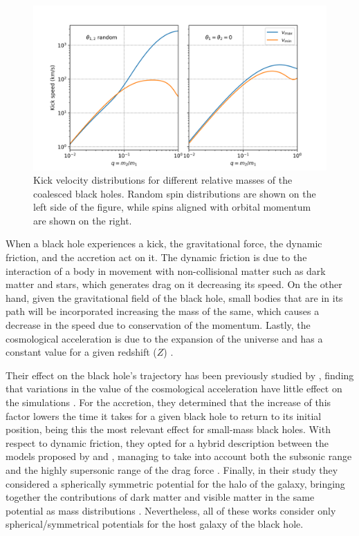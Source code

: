 	\begin{figure}[h]
		\centering
		\includegraphics[width=0.9\linewidth]{"../Files/Week 10/Tanaka"}
		\caption{Kick velocity distributions for different relative masses of the coalesced black holes. Random spin distributions are shown on the left side of the figure, while spins aligned with orbital momentum are shown on the right.}
		\label{fig: tanakaSpeeds}
	\end{figure}
	
	When a black hole experiences a kick, the gravitational force, the dynamic friction, and the accretion act on it. The dynamic friction is due to the interaction of a body in movement with non-collisional matter such as dark matter and stars, which generates drag on it decreasing its speed. On the other hand, given the gravitational field of the black hole, small bodies that are in its path will be incorporated increasing the mass of the same, which causes a decrease in the speed due to conservation of the momentum. Lastly, the cosmological acceleration is due to the expansion of the universe and has a constant value for a given redshift ($Z$) \cite{choksi2017recoiling}.
	
	Their effect on the black hole's trajectory has been previously studied by \citeauthor{choksi2017recoiling}, finding that variations in the value of the cosmological acceleration have little effect on the simulations \cite{choksi2017recoiling}. For the accretion, they determined that the increase of this factor lowers the time it takes for a given black hole to return to its initial position, being this the most relevant effect for small-mass black holes. With respect to dynamic friction, they opted for a hybrid description between the models proposed by \citeauthor{ostriker1999dynamical} and \citeauthor{escala2005role}, managing to take into account both the subsonic range and the highly supersonic range of the drag force \cite{ostriker1999dynamical, escala2005role}. Finally, in their study they considered a spherically symmetric potential for the halo of the galaxy, bringing together the contributions of dark matter and visible matter in the same potential as mass distributions \cite{choksi2017recoiling}. Nevertheless, all of these works consider only spherical/symmetrical potentials for the host galaxy of the black hole.
	
